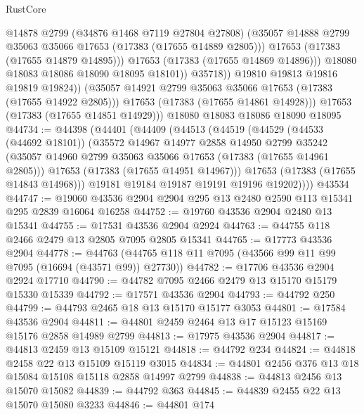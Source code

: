 \begin{lexlean}{RustCore}
\begin{coremodule}
                        @14878
                        @2799
                        (@34876 @1468 @7119 @27804 @27808)
                        (@35057 @14888 @2799 @35063 @35066 @17653 (@17383 (@17655 @14889 @2805)))
                        @17653
                        (@17383 (@17655 @14879 @14895)))
                      @17653
                      (@17383 (@17655 @14869 @14896)))
                    @18080
                    @18083
                    @18086
                    @18090
                    @18095
                    @18101))
                @35718))
            @19810
            @19813
            @19816
            @19819
            @19824))
        (@35057 @14921 @2799 @35063 @35066 @17653 (@17383 (@17655 @14922 @2805)))
        @17653
        (@17383 (@17655 @14861 @14928)))
      @17653
      (@17383 (@17655 @14851 @14929)))
    @18080
    @18083
    @18086
    @18090
    @18095
@44734 := @44398
    (@44401
      (@44409
        (@44513
          (@44519
            (@44529
              (@44533 (@44692 @18101))
              (@35572
                @14967
                @14977
                @2858
                @14950
                @2799
                @35242
                (@35057 @14960 @2799 @35063 @35066 @17653 (@17383 (@17655 @14961 @2805)))
                @17653
                (@17383 (@17655 @14951 @14967)))
              @17653
              (@17383 (@17655 @14843 @14968)))
            @19181
            @19184
            @19187
            @19191
            @19196
            @19202))))
    @43534
@44747 := @19060 @43536 @2904 @2904 @295 @13 @2480 @2590 @113 @15341 @295 @2839 @16064 @16258
@44752 := @19760 @43536 @2904 @2480 @13 @15341
@44755 := @17531 @43536 @2904 @2924
@44763 := @44755 @118 @2466 @2479 @13 @2805 @7095 @2805 @15341
@44765 := @17773 @43536 @2904
@44778 := @44763 (@44765 @118 @11 @7095 (@43566 @99 @11 @99 @7095 (@16694 (@43571 @99)) @27730))
@44782 := @17706 @43536 @2904 @2924 @17710
@44790 := @44782 @7095 @2466 @2479 @13 @15170 @15179 @15330 @15339
@44792 := @17571 @43536 @2904
@44793 := @44792 @250
@44799 := @44793 @2465 @18 @13 @15170 @15177 @3053
@44801 := @17584 @43536 @2904
@44811 := @44801 @2459 @2464 @13 @17 @15123 @15169 @15176 @2858 @14989 @2799
@44813 := @17975 @43536 @2904
@44817 := @44813 @2459 @13 @15109 @15121
@44818 := @44792 @234
@44824 := @44818 @2458 @22 @13 @15109 @15119 @3015
@44834 := @44801 @2456 @376 @13 @18 @15084 @15108 @15118 @2858 @14997 @2799
@44838 := @44813 @2456 @13 @15070 @15082
@44839 := @44792 @363
@44845 := @44839 @2455 @22 @13 @15070 @15080 @3233
@44846 := @44801 @174

\end{coremodule}
\end{lexlean}
